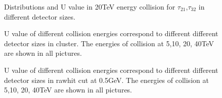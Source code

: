 \label{sec:Mann Whitney U test}


\begin{figure}
\begin{center}

\end{center}
\caption{Distributions and U value in 20TeV energy collision for $\tau_{21}$,$\tau_{32}$ in different detector sizes.}
\label{fig:cluster_tau21_tau32}
\end{figure}


\begin{figure}
\begin{center}
\end{center}
\caption{U value of different collision energies correspond to different different detector sizes in cluster. The energies of collision at 5,10, 20, 40TeV are shown in all pictures.}
\label{fig:cluster_U_summary}
\end{figure}


\begin{figure}
\begin{center}
\end{center}
\caption{U value of different collision energies correspond to different different detector sizes in rawhit cut at 0.5GeV. The energies of collision at 5,10, 20, 40TeV are shown in all pictures.}
\label{fig:raw_U_summary}
\end{figure}

